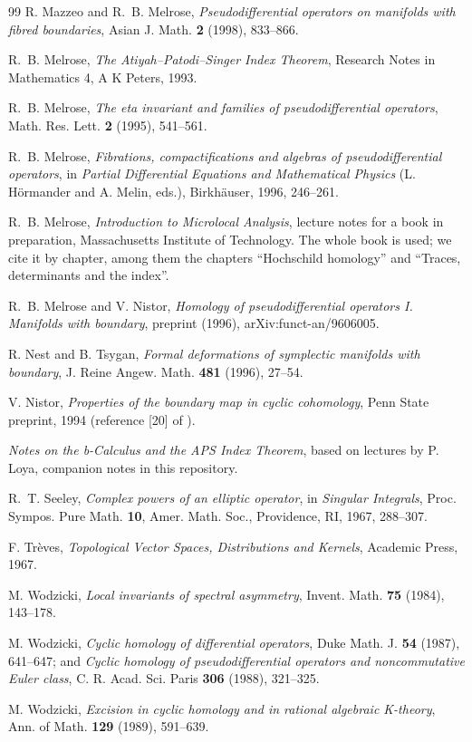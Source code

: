 \documentclass[11pt,oneside,reqno]{article}
\theoremstyle{plain}
\theoremstyle{definition}
\theoremstyle{remark}
\begin{document}
\begin{thebibliography}{99}
R. Mazzeo and R.~B. Melrose,
\emph{Pseudodifferential operators on manifolds with fibred boundaries},
Asian J. Math. \textbf{2} (1998), 833--866.

R.~B. Melrose,
\emph{The Atiyah--Patodi--Singer Index Theorem},
Research Notes in Mathematics 4, A K Peters, 1993.

R.~B. Melrose,
\emph{The eta invariant and families of pseudodifferential operators},
Math. Res. Lett. \textbf{2} (1995), 541--561.

R.~B. Melrose,
\emph{Fibrations, compactifications and algebras of pseudodifferential
operators}, in \emph{Partial Differential Equations and Mathematical
Physics} (L. H\"ormander and A. Melin, eds.), Birkh\"auser, 1996,
246--261.

R.~B. Melrose,
\emph{Introduction to Microlocal Analysis}, lecture notes for a book in
preparation, Massachusetts Institute of Technology. The whole book is
used; we cite it by chapter, among them the chapters ``Hochschild
homology'' and ``Traces, determinants and the index''.

R.~B. Melrose and V. Nistor,
\emph{Homology of pseudodifferential operators I. Manifolds with boundary},
preprint (1996), arXiv:funct-an/9606005.

R. Nest and B. Tsygan,
\emph{Formal deformations of symplectic manifolds with boundary},
J. Reine Angew. Math. \textbf{481} (1996), 27--54.

V. Nistor,
\emph{Properties of the boundary map in cyclic cohomology},
Penn State preprint, 1994 (reference [20] of \cite{MN}).

\emph{Notes on the b-Calculus and the APS Index Theorem}, based on lectures
by P. Loya, companion notes in this repository.

R.~T. Seeley,
\emph{Complex powers of an elliptic operator}, in \emph{Singular
Integrals}, Proc. Sympos. Pure Math. \textbf{10}, Amer. Math. Soc.,
Providence, RI, 1967, 288--307.

F. Tr\`eves,
\emph{Topological Vector Spaces, Distributions and Kernels},
Academic Press, 1967.

M. Wodzicki,
\emph{Local invariants of spectral asymmetry},
Invent. Math. \textbf{75} (1984), 143--178.

M. Wodzicki,
\emph{Cyclic homology of differential operators},
Duke Math. J. \textbf{54} (1987), 641--647; and
\emph{Cyclic homology of pseudodifferential operators and noncommutative
Euler class}, C. R. Acad. Sci. Paris \textbf{306} (1988), 321--325.

M. Wodzicki,
\emph{Excision in cyclic homology and in rational algebraic K-theory},
Ann. of Math. \textbf{129} (1989), 591--639.

\end{thebibliography}
\end{document}
